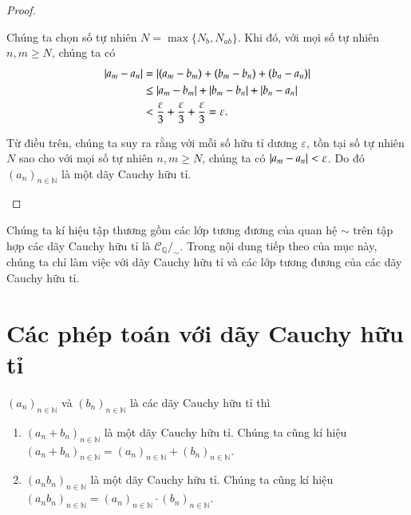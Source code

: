 \begin{proof}
\begin{enumerate}[label={(\roman*)},itemsep=0pt]
              Chúng ta chọn số tự nhiên $N = \max\{ N_{b}, N_{ab} \}$. Khi đó, với mọi số tự nhiên $n, m\geq N$, chúng ta có
              \begin{align*}
                  \left\vert{a_{m} - a_{n}}\right\vert & = \left\vert{(a_{m} - b_{m}) + (b_{m} - b_{n}) + (b_{n} - a_{n})}\right\vert                            \\
                                      & \leq \left\vert{a_{m} - b_{m}}\right\vert + \left\vert{b_{m} - b_{n}}\right\vert + \left\vert{b_{n} - a_{n}}\right\vert                   \\
                                      & < \frac{\varepsilon}{3} + \frac{\varepsilon}{3} + \frac{\varepsilon}{3} = \varepsilon.
              \end{align*}

              Từ điều trên, chúng ta suy ra rằng với mỗi số hữu tỉ dương $\varepsilon$, tồn tại số tự nhiên $N$ sao cho với mọi số tự nhiên $n, m\geq N$, chúng ta có $\left\vert{a_{m} - a_{n}}\right\vert < \varepsilon$. Do đó ${(a_{n})}_{n\in\mathbb{N}}$ là một dãy Cauchy hữu tỉ.
    \end{enumerate}
\end{proof}

Chúng ta kí hiệu tập thương gồm các lớp tương đương của quan hệ $\sim$ trên tập hợp các dãy Cauchy hữu tỉ là $\mathscr{C}_{\mathbb{Q}}/_{\sim}$. Trong nội dung tiếp theo của mục này, chúng ta chỉ làm việc với dãy Cauchy hữu tỉ và các lớp tương đương của các dãy Cauchy hữu tỉ.

\section{Các phép toán với dãy Cauchy hữu tỉ}

\begin{appendixthm}\label{appendixthm:addition-and-multiplication-of-cauchy-sequences}
    ${(a_{n})}_{n\in\mathbb{N}}$ và ${(b_{n})}_{n\in\mathbb{N}}$ là các dãy Cauchy hữu tỉ thì
    \begin{enumerate}[label={(\roman*)}]
        \item ${(a_{n} + b_{n})}_{n\in\mathbb{N}}$ là một dãy Cauchy hữu tỉ. Chúng ta cũng kí hiệu ${(a_{n} + b_{n})}_{n\in\mathbb{N}} = {(a_{n})}_{n\in\mathbb{N}} + {(b_{n})}_{n\in\mathbb{N}}$.
        \item ${(a_{n}b_{n})}_{n\in\mathbb{N}}$ là một dãy Cauchy hữu tỉ. Chúng ta cũng kí hiệu ${(a_{n}b_{n})}_{n\in\mathbb{N}} = {(a_{n})}_{n\in\mathbb{N}}\cdot {(b_{n})}_{n\in\mathbb{N}}$.
    \end{enumerate}
\end{appendixthm}

